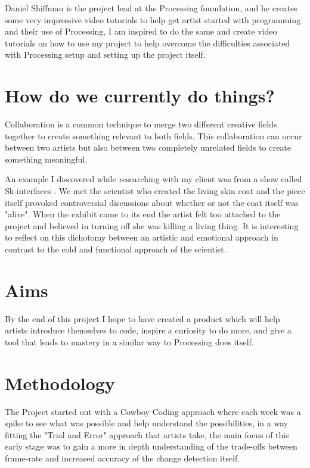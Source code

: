 \documentclass[a4paper]{report}
\begin{document}
Daniel Shiffman \cite{SHIFFMAN} is the project lead at the Processing foundation, and he creates some very impressive video tutorials to help get artist started with programming and their use of Processing, I am inspired to do the same and create video tutorials on how to use my project to help overcome the difficulties associated with Processing setup and setting up the project itself.

\section{How do we currently do things?}
Collaboration is a common technique to merge two different creative fields together to create something relevant to both fields. This collaboration can occur between two artists but also between two completely unrelated fields to create something meaningful. 

An example I discovered while researching with my client was from a show called Sk-interfaces \cite{SKIN}. We met the scientist who created the living skin coat and the piece itself provoked controversial discussions about whether or not the coat itself was "alive". When the exhibit came to its end the artist felt too attached to the project and believed in turning off she was killing a living thing. It is interesting to reflect on this dichotomy between an artistic and emotional approach in contrast to the cold and functional approach of the scientist.

\section{Aims}
By the end of this project I hope to have created a product which will help artists introduce themselves to code, inspire a curiosity to do more, and give a tool that leads to mastery in a similar way to Processing\cite{PROCESSING} does itself.

\section{Methodology}
The Project started out with a Cowboy Coding approach where each week was a spike to see what was possible and help understand the possibilities, in a way fitting the "Trial and Error" approach that artists take, the main focus of this early stage was to gain a more in depth understanding of the trade-offs between frame-rate and increased accuracy of the change detection itself.
\end{document}
